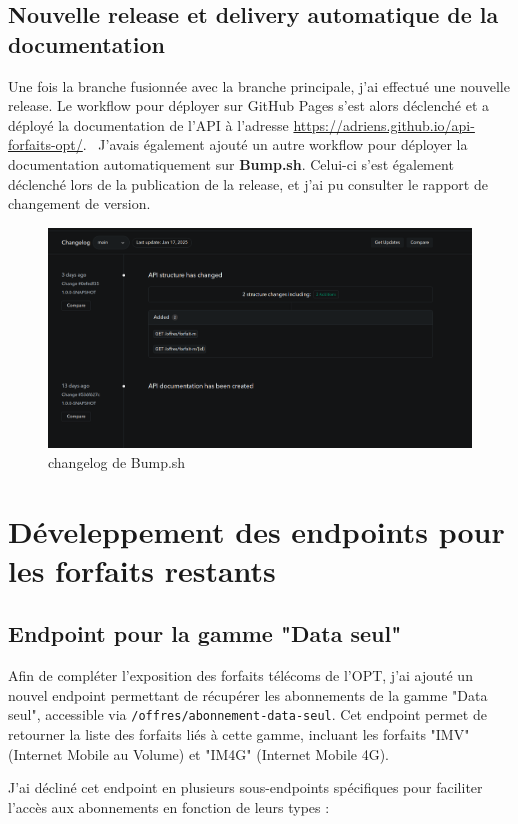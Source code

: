 \documentclass[11pt]{article}
\begin{document}
		\subsection*{Nouvelle release et delivery  automatique de la documentation}
		
		Une fois la branche fusionnée avec la branche principale, j'ai effectué une nouvelle release. Le workflow pour déployer sur GitHub Pages s'est alors déclenché et a déployé la documentation de l'API à l'adresse \url{https://adriens.github.io/api-forfaits-opt/}. \ J'avais également ajouté un autre workflow pour déployer la documentation automatiquement sur \textbf{Bump.sh}. Celui-ci s'est également déclenché lors de la publication de la release, et j'ai pu consulter le rapport de changement de version.
		\begin{figure}[H] \centering \includegraphics[width=\textwidth]{asset/changelog.png} \caption{changelog de Bump.sh} \label{fig:sonarq}\end{figure}
		\section{Déveleppement des endpoints pour les forfaits restants}
		\subsection*{Endpoint pour la gamme "Data seul"}
		
		Afin de compléter l'exposition des forfaits télécoms de l'OPT, j'ai ajouté un nouvel endpoint permettant de récupérer les abonnements de la gamme "Data seul", accessible via \texttt{/offres/abonnement-data-seul}. Cet endpoint permet de retourner la liste des forfaits liés à cette gamme, incluant les forfaits "IMV" (Internet Mobile au Volume) et "IM4G" (Internet Mobile 4G).
		
		J'ai décliné cet endpoint en plusieurs sous-endpoints spécifiques pour faciliter l'accès aux abonnements en fonction de leurs types :
	
\end{document}

